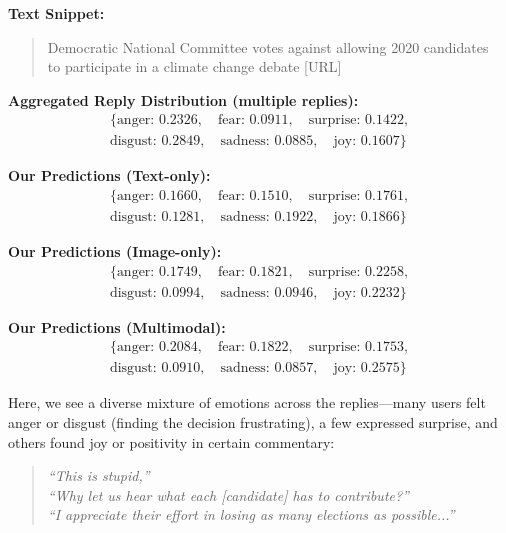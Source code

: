 \noindent\textbf{Text Snippet:}
\begin{quote}
Democratic National Committee votes against allowing 2020 candidates \\
to participate in a climate change debate [URL]
\end{quote}

\noindent\textbf{Aggregated Reply Distribution (multiple replies):}
\[
\begin{aligned}
\{\text{anger: } 0.2326, \quad \text{fear: } 0.0911, \quad \text{surprise: } 0.1422, \\
\text{disgust: } 0.2849, \quad \text{sadness: } 0.0885, \quad \text{joy: } 0.1607\}
\end{aligned}
\]

\noindent\textbf{Our Predictions (Text-only):}
\[
\begin{aligned}
\{\text{anger: } 0.1660, \quad \text{fear: } 0.1510, \quad \text{surprise: } 0.1761, \\
\text{disgust: } 0.1281, \quad \text{sadness: } 0.1922, \quad \text{joy: } 0.1866\}
\end{aligned}
\]

\noindent\textbf{Our Predictions (Image-only):}
\[
\begin{aligned}
\{\text{anger: } 0.1749, \quad \text{fear: } 0.1821, \quad \text{surprise: } 0.2258, \\
\text{disgust: } 0.0994, \quad \text{sadness: } 0.0946, \quad \text{joy: } 0.2232\}
\end{aligned}
\]

\noindent\textbf{Our Predictions (Multimodal):}
\[
\begin{aligned}
\{\text{anger: } 0.2084, \quad \text{fear: } 0.1822, \quad \text{surprise: } 0.1753, \\
\text{disgust: } 0.0910, \quad \text{sadness: } 0.0857, \quad \text{joy: } 0.2575\}
\end{aligned}
\]

Here, we see a diverse mixture of emotions across the replies—many users felt anger or disgust (finding the decision frustrating), a few expressed surprise, and others found joy or positivity in certain commentary:

\begin{quote}
\emph{``This is stupid,''} \\
\emph{``Why let us hear what each [candidate] has to contribute?''} \\
\emph{``I appreciate their effort in losing as many elections as possible...''}
\end{quote}

